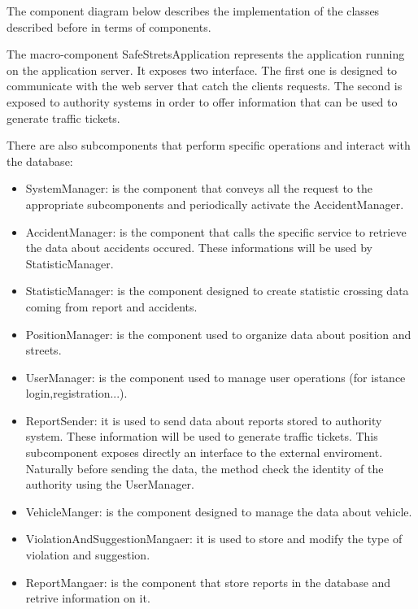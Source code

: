 The component diagram below describes the implementation of the classes described before in terms of components.

The macro-component SafeStretsApplication represents the application running on the application server. It exposes two interface. The first one is designed to communicate with the web server that catch the clients requests. The second is exposed to authority systems in order to offer information that can be used to generate traffic tickets.

There are also subcomponents that perform specific operations and interact with the database:
\begin{itemize}
 \item 
 SystemManager: is the component that conveys all the request to the appropriate subcomponents and periodically activate the AccidentManager.
 \item 
 AccidentManager: is the component that calls the specific service to retrieve the data about accidents occured. These informations will be used by StatisticManager.
 \item
 StatisticManager: is the component designed to create statistic crossing data coming from report and accidents.
 \item 
 PositionManager: is the component used to organize data about position and streets.
 \item 
 UserManager: is the component used to manage user operations (for istance login,registration...).
 \item
 ReportSender: it is used to send data about reports stored to authority system. These information will be used to generate traffic tickets. This subcomponent exposes directly an interface to the external enviroment. Naturally before sending the data, the method check the identity of the authority using the UserManager.
 \item 
 VehicleManger: is the component designed to manage the data about vehicle.
 \item 
 ViolationAndSuggestionMangaer: it is used to store and modify the type of violation and suggestion.
 \item 
 ReportMangaer: is the component that store reports in the database and retrive information on it.
 
\end{itemize}

